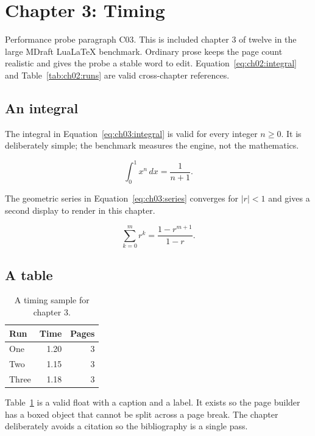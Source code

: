 \section{Chapter 3: Timing}
\label{sec:ch03}

Performance probe paragraph C03. This is included chapter 3 of twelve in
the large MDraft LuaLaTeX benchmark. Ordinary prose keeps the page count
realistic and gives the probe a stable word to edit. Equation~\ref{eq:ch02:integral} and
Table~\ref{tab:ch02:runs} are valid cross-chapter references.

\subsection{An integral}
The integral in Equation~\ref{eq:ch03:integral} is valid for every integer
$n \ge 0$. It is deliberately simple; the benchmark measures the engine, not
the mathematics.

\begin{equation}
  \label{eq:ch03:integral}
  \int_{0}^{1} x^{n}\,dx = \frac{1}{n+1}.
\end{equation}

The geometric series in Equation~\ref{eq:ch03:series} converges for
$|r| < 1$ and gives a second display to render in this chapter.

\begin{equation}
  \label{eq:ch03:series}
  \sum_{k=0}^{m} r^{k} = \frac{1-r^{m+1}}{1-r}.
\end{equation}

\subsection{A table}
\begin{table}[h]
  \centering
  \begin{tabular}{lrr}
    \toprule
    Run & Time & Pages \\
    \midrule
    One   & 1.20 & 3 \\
    Two   & 1.15 & 3 \\
    Three & 1.18 & 3 \\
    \bottomrule
  \end{tabular}
  \caption{A timing sample for chapter 3.}
  \label{tab:ch03:runs}
\end{table}

Table~\ref{tab:ch03:runs} is a valid float with a caption and a label. It
exists so the page builder has a boxed object that cannot be split across a
page break. The chapter deliberately avoids a citation so the bibliography is a single pass.

